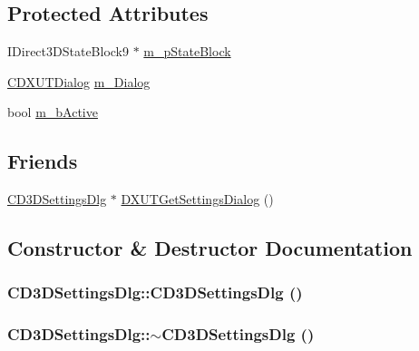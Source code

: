 \subsection*{Protected Attributes}
\begin{DoxyCompactItemize}
\item 
IDirect3DStateBlock9 $\ast$ \hyperlink{class_c_d3_d_settings_dlg_af8e1e88711501924bd091fe0792cb489}{m\_\-pStateBlock}
\item 
\hyperlink{class_c_d_x_u_t_dialog}{CDXUTDialog} \hyperlink{class_c_d3_d_settings_dlg_a6653f7f7899c31f909c2d7542babc521}{m\_\-Dialog}
\item 
bool \hyperlink{class_c_d3_d_settings_dlg_ad080d36c3e4fc29a7909a7962b11fa78}{m\_\-bActive}
\end{DoxyCompactItemize}
\subsection*{Friends}
\begin{DoxyCompactItemize}
\item 
\hyperlink{class_c_d3_d_settings_dlg}{CD3DSettingsDlg} $\ast$ \hyperlink{class_c_d3_d_settings_dlg_a48e0861d43a45a17f8ab5e9d46efa7c9}{DXUTGetSettingsDialog} ()
\end{DoxyCompactItemize}


\subsection{Constructor \& Destructor Documentation}
\hypertarget{class_c_d3_d_settings_dlg_acbdec2882322c04fb6088e80721e6d96}{
\subsubsection[{CD3DSettingsDlg}]{\setlength{\rightskip}{0pt plus 5cm}CD3DSettingsDlg::CD3DSettingsDlg ()}}
\label{class_c_d3_d_settings_dlg_acbdec2882322c04fb6088e80721e6d96}
\hypertarget{class_c_d3_d_settings_dlg_a79c0f732c733d7a06086a2b1d313b7ac}{
\subsubsection[{$\sim$CD3DSettingsDlg}]{\setlength{\rightskip}{0pt plus 5cm}CD3DSettingsDlg::$\sim$CD3DSettingsDlg ()}}
\label{class_c_d3_d_settings_dlg_a79c0f732c733d7a06086a2b1d313b7ac}


